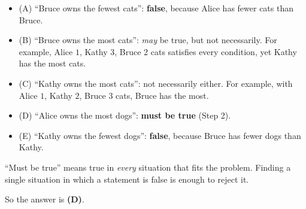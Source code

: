 {
\begin{itemize}[leftmargin=1.3em,itemsep=1pt]
\item (A) ``Bruce owns the fewest cats'': \textbf{false}, because Alice has fewer cats than Bruce.
\item (B) ``Bruce owns the most cats'': \emph{may} be true, but not necessarily. For example, Alice $1$, Kathy $3$, Bruce $2$ cats satisfies every condition, yet Kathy has the most cats.
\item (C) ``Kathy owns the most cats'': not necessarily either. For example, with Alice $1$, Kathy $2$, Bruce $3$ cats, Bruce has the most.
\item (D) ``Alice owns the most dogs'': \textbf{must be true} (Step 2).
\item (E) ``Kathy owns the fewest dogs'': \textbf{false}, because Bruce has fewer dogs than Kathy.
\end{itemize}
\begin{warnbox}``Must be true'' means true in \emph{every} situation that fits the problem. Finding a single situation in which a statement is false is enough to reject it.\end{warnbox}
So the answer is \textbf{(D)}.
}

